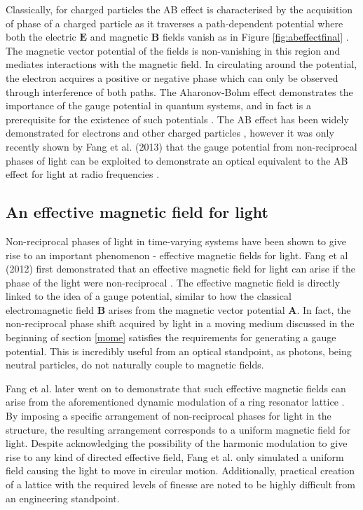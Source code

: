 Classically, for charged particles the AB effect is characterised by the acquisition of phase of a charged particle as it traverses a path-dependent potential where both the electric $\bm{E}$ and magnetic $\bm{B}$ fields vanish as in Figure \ref{fig:abeffectfinal} \cite{Aharonov1959}. The magnetic vector potential of the fields is non-vanishing in this region and mediates interactions with the magnetic field. In circulating around the potential, the electron acquires a positive or negative phase which can only be observed through interference of both paths. The Aharonov-Bohm effect demonstrates the importance of the gauge potential in quantum systems, and in fact is a prerequisite for the existence of such potentials \cite{Aharonov1959}. The AB effect has been widely demonstrated for electrons and other charged particles \cite{Chambers1960}, however it was only recently shown by Fang et al. (2013) that the gauge potential from non-reciprocal phases of light can be exploited to demonstrate an optical equivalent to the AB effect for light at radio frequencies \cite{Fang2013c}.
 

 \subsection{An effective magnetic field for light}
 Non-reciprocal phases of light in time-varying systems have been shown to give rise to an important phenomenon - effective magnetic fields for light. Fang et al (2012) first demonstrated that an effective magnetic field for light can arise if the phase of the light were non-reciprocal \cite{Fang2012a}. The effective magnetic field is directly linked to the idea of a gauge potential, similar to how the classical electromagnetic field $\bm{B}$ arises from the magnetic vector potential $\bm{A}$. In fact, the non-reciprocal phase shift acquired by light in a moving medium discussed in the beginning of section \ref{mome} satisfies the requirements for generating a gauge potential. This is incredibly useful from an optical standpoint, as photons, being neutral particles, do not naturally couple to magnetic fields.
 
 Fang et al. later went on to demonstrate that such effective magnetic fields can arise from the aforementioned dynamic modulation of a ring resonator lattice \cite{Fang2013}. By imposing a specific arrangement of non-reciprocal phases for light in the structure, the resulting arrangement corresponds to a uniform magnetic field for light. Despite acknowledging the possibility of the harmonic modulation to give rise to any kind of directed effective field, Fang et al. only simulated a uniform field causing the light to move in circular motion. Additionally, practical creation of a lattice with the required levels of finesse are noted to be highly difficult from an engineering standpoint.
 
